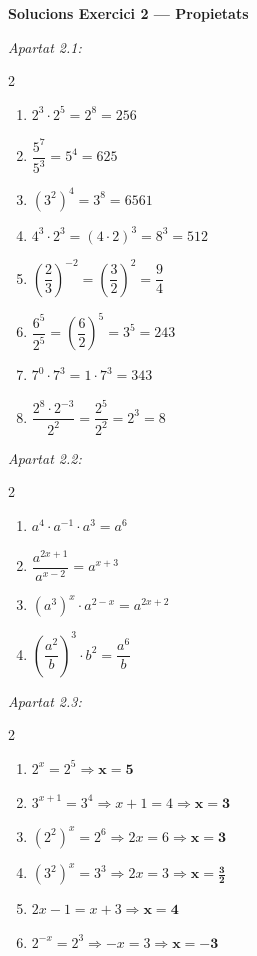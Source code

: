 \documentclass[12pt,a4paper]{article}
\begin{document}
\vspace{0.5cm}

\noindent\textbf{Solucions Exercici 2 --- Propietats}

\vspace{0.2cm}
\noindent\textit{Apartat 2.1:}

\begin{multicols}{2}
\begin{enumerate}[label=\textbf{\alph*)}, leftmargin=1.2cm, itemsep=0.2cm]
    \item $2^3 \cdot 2^5 = 2^{8} = 256$
    \item $\dfrac{5^7}{5^3} = 5^{4} = 625$
    \item $(3^2)^4 = 3^{8} = 6561$
    \item $4^3 \cdot 2^3 = (4 \cdot 2)^3 = 8^3 = 512$
    \item $\left(\dfrac{2}{3}\right)^{-2} = \left(\dfrac{3}{2}\right)^2 = \dfrac{9}{4}$
    \item $\dfrac{6^5}{2^5} = \left(\dfrac{6}{2}\right)^5 = 3^5 = 243$
    \item $7^0 \cdot 7^3 = 1 \cdot 7^3 = 343$
    \item $\dfrac{2^8 \cdot 2^{-3}}{2^2} = \dfrac{2^{5}}{2^2} = 2^3 = 8$
\end{enumerate}
\end{multicols}

\vspace{0.3cm}
\noindent\textit{Apartat 2.2:}

\begin{multicols}{2}
\begin{enumerate}[label=\textbf{\alph*)}, leftmargin=1.2cm, itemsep=0.2cm]
    \item $a^4 \cdot a^{-1} \cdot a^3 = a^{6}$
    \item $\dfrac{a^{2x+1}}{a^{x-2}} = a^{x+3}$
    \item $(a^3)^x \cdot a^{2-x} = a^{2x+2}$
    \item $\left(\dfrac{a^2}{b}\right)^3 \cdot b^2 = \dfrac{a^6}{b}$
\end{enumerate}
\end{multicols}

\vspace{0.3cm}
\noindent\textit{Apartat 2.3:}

\begin{multicols}{2}
\begin{enumerate}[label=\textbf{\alph*)}, leftmargin=1.2cm, itemsep=0.2cm]
    \item $2^x = 2^5 \Rightarrow \boldsymbol{x = 5}$
    \item $3^{x+1} = 3^4 \Rightarrow x+1=4 \Rightarrow \boldsymbol{x=3}$
    \item $(2^2)^x = 2^6 \Rightarrow 2x=6 \Rightarrow \boldsymbol{x=3}$
    \item $(3^2)^x = 3^3 \Rightarrow 2x=3 \Rightarrow \boldsymbol{x=\tfrac{3}{2}}$
    \item $2x-1=x+3 \Rightarrow \boldsymbol{x=4}$
    \item $2^{-x}=2^3 \Rightarrow -x=3 \Rightarrow \boldsymbol{x=-3}$
\end{enumerate}
\end{multicols}
\end{document}
